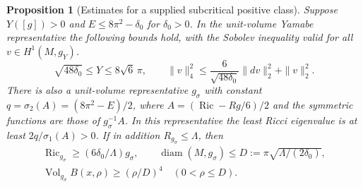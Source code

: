 \documentclass[11pt]{article}
\numberwithin{equation}{section}
\newtheorem{proposition}[theorem]{Proposition}
\theoremstyle{definition}
\theoremstyle{remark}
\begin{document}
\begin{proposition}[Estimates for a supplied subcritical positive class]\label{var:gauges}
Suppose \(Y([g])>0\) and \(E\le8\pi^2-\delta_0\) for \(\delta_0>0\).
In the unit-volume Yamabe representative the following bounds hold,
with the Sobolev inequality valid for all \(v\in H^1(M,g_Y)\).
\begin{equation}\label{var:sobolev}
 \sqrt{48\delta_0}\le Y\le8\sqrt6\,\pi,\qquad
 \|v\|_4^2\le \frac6{\sqrt{48\delta_0}}\|dv\|_2^2+\|v\|_2^2 .
\end{equation}
There is also a unit-volume representative \(g_\sigma\) with
constant \(q=\sigma_2(A)=(8\pi^2-E)/2\), where
\(A=(\operatorname{Ric}-R g/6)/2\) and the symmetric functions
are those of \(g_\sigma^{-1}A\). In this representative the
least Ricci eigenvalue is at least \(2q/\sigma_1(A)>0\).
If in addition \(R_{g_\sigma}\le\Lambda\), then
\begin{equation}\label{var:diameter}
 \begin{gathered}
 \operatorname{Ric}_{g_\sigma}\ge(6\delta_0/\Lambda)g_\sigma,
 \qquad \operatorname{diam}(M,g_\sigma)\le
 D:=\pi\sqrt{\Lambda/(2\delta_0)},\\
 \operatorname{Vol}_{g_\sigma}B(x,\rho)\ge(\rho/D)^4
 \quad(0<\rho\le D).
 \end{gathered}
\end{equation}
\end{proposition}
\end{document}
